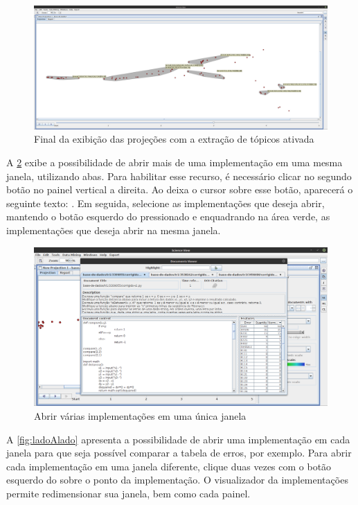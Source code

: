 		\begin{figure}
			\centering
			\includegraphics[width=0.8\linewidth]{imagem/topics3}
			\caption{Final da exibição das projeções com a extração de tópicos ativada}
			\label{fig:topics3}
		\end{figure}
		
		A \cref{fig:multiplosDoc} exibe a possibilidade de abrir mais de uma implementação
		em uma mesma janela, utilizando abas. Para habilitar esse recurso, é necessário
		clicar no segundo botão no painel vertical a direita. Ao deixa o cursor sobre esse
		botão, aparecerá o seguinte texto: . Em seguida, selecione
		as implementações que deseja abrir, mantendo o botão esquerdo do 
		pressionado e enquadrando na área verde, as implementações que deseja abrir na
		mesma janela.
		
		\begin{figure}
			\centering
			\includegraphics[width=0.7\linewidth]{imagem/multiplosDoc}
			\caption{Abrir várias implementações em uma única janela}
			\label{fig:multiplosDoc}
		\end{figure}
		
		A \cref{fig:ladoAlado} apresenta a possibilidade de abrir uma implementação em
		cada janela para que seja possível comparar a tabela de erros, por exemplo.
		Para abrir cada implementação em uma janela diferente, clique duas vezes com
		o botão esquerdo do  sobre o ponto da implementação. O
		visualizador da implementações permite redimensionar sua janela, bem como
		cada painel.
		
